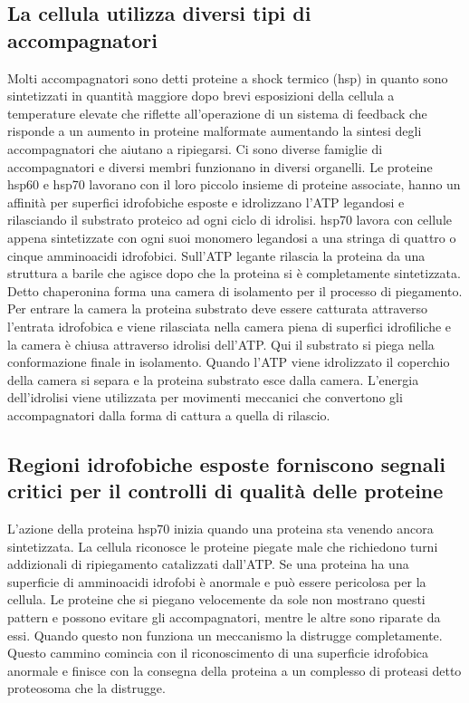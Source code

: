 \subsection{La cellula utilizza diversi tipi di accompagnatori}
Molti accompagnatori sono detti proteine a shock termico (hsp) in quanto sono sintetizzati in quantit\`a maggiore dopo brevi esposizioni della cellula a temperature elevate che
riflette all'operazione di un sistema di feedback che risponde a un aumento in proteine malformate aumentando la sintesi degli accompagnatori che aiutano a ripiegarsi. Ci sono diverse
famiglie di accompagnatori e diversi membri funzionano in diversi organelli. Le proteine hsp60 e hsp70 lavorano con il loro piccolo insieme di proteine associate, hanno un affinit\`a
per superfici idrofobiche esposte e idrolizzano l'ATP legandosi e rilasciando il substrato proteico ad ogni ciclo di idrolisi. hsp70 lavora con cellule appena sintetizzate con ogni
suoi monomero legandosi a una stringa di quattro o cinque amminoacidi idrofobici. Sull'ATP legante rilascia la proteina da una struttura a barile che agisce dopo che la proteina si \`e
completamente sintetizzata. Detto chaperonina forma una camera di isolamento per il processo di piegamento. Per entrare la camera la proteina substrato deve essere catturata attraverso
l'entrata idrofobica e viene rilasciata nella camera piena di superfici idrofiliche e la camera \`e chiusa attraverso idrolisi dell'ATP. Qui il substrato si piega nella conformazione
finale in isolamento. Quando l'ATP viene idrolizzato il coperchio della camera si separa e la proteina substrato esce dalla camera. L'energia dell'idrolisi viene utilizzata per 
movimenti meccanici che convertono gli accompagnatori dalla forma di cattura a quella di rilascio. 
\subsection{Regioni idrofobiche esposte forniscono segnali critici per il controlli di qualit\`a delle proteine}
L'azione della proteina hsp70 inizia quando una proteina sta venendo ancora sintetizzata. La cellula riconosce le proteine piegate male che richiedono turni addizionali di ripiegamento
catalizzati dall'ATP. Se una proteina ha una superficie di amminoacidi idrofobi \`e anormale e pu\`o essere pericolosa per la cellula. Le proteine che si piegano velocemente da sole
non mostrano questi pattern e possono evitare gli accompagnatori, mentre le altre sono riparate da essi. Quando questo non funziona un meccanismo la distrugge completamente. Questo 
cammino comincia con il riconoscimento di una superficie idrofobica anormale e finisce con la consegna della proteina a un complesso di proteasi detto proteosoma che la distrugge. 
